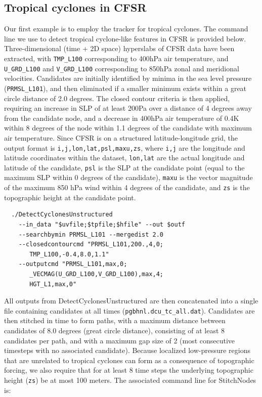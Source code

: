 \documentclass[gmdd, hvmath, online]{copernicus_discussions}
\begin{document}
\subsection{Tropical cyclones in CFSR} \label{sec:TropicalCycloneExample}

Our first example is to employ the tracker for tropical cyclones.  The command line we use to detect tropical cyclone-like features in CFSR is provided below.  Three-dimensional (time + 2D space) hyperslabs of CFSR data have been extracted, with \texttt{TMP\_L100} corresponding to 400hPa air temperature, and \texttt{U\_GRD\_L100} and \texttt{V\_GRD\_L100} corresponding to 850hPa zonal and meridional velocities.  Candidates are initially identified by minima in the sea level pressure (\texttt{PRMSL\_L101}), and then eliminated if a smaller minimum exists within a great circle distance of 2.0 degrees.  The closed contour criteria is then applied, requiring an increase in SLP of at least 200Pa over a distance of 4 degrees away from the candidate node, and a decrease in 400hPa air temperature of 0.4K within 8 degrees of the node within 1.1 degrees of the candidate with maximum air temperature.  Since CFSR is on a structured latitude-longitude grid, the output format is \texttt{i,j,lon,lat,psl,maxu,zs}, where \texttt{i,j} are the longitude and latitude coordinates within the dataset, \texttt{lon,lat} are the actual longitude and latitude of the candidate, \texttt{psl} is the SLP at the candidate point (equal to the maximum SLP within 0 degrees of the candidate), \texttt{maxu} is the vector magnitude of the maximum 850 hPa wind within 4 degrees of the candidate, and \texttt{zs} is the topographic height at the candidate point.

{\small \begin{verbatim}
  ./DetectCyclonesUnstructured
    --in_data "$uvfile;$tpfile;$hfile" --out $outf
    --searchbymin PRMSL_L101 --mergedist 2.0
    --closedcontourcmd "PRMSL_L101,200.,4,0;
       TMP_L100,-0.4,8.0,1.1"
    --outputcmd "PRMSL_L101,max,0;
       _VECMAG(U_GRD_L100,V_GRD_L100),max,4;
       HGT_L1,max,0"
\end{verbatim}}

All outputs from DetectCyclonesUnstructured are then concatenated into a single file containing candidates at all times (\texttt{pgbhnl.dcu\_tc\_all.dat}).  Candidates are then stitched in time to form paths, with a maximum distance between candidates of 8.0 degrees (great circle distance), consisting of at least 8 candidates per path, and with a maximum gap size of 2 (most consecutive timesteps with no associated candidate).  Because localized low-pressure regions that are unrelated to tropical cyclones can form as a consequence of topographic forcing, we also require that for at least 8 time steps the underlying topographic height (\texttt{zs}) be at most 100 meters.  The associated command line for StitchNodes is:
\end{document}
